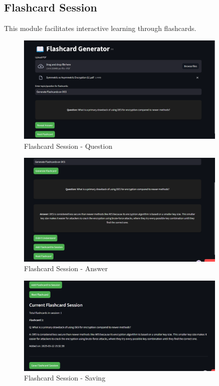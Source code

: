 \documentclass{report}
\begin{document}
\subsection{Flashcard Session}
This module facilitates interactive learning through flashcards.
\begin{figure}[H]
\centering
\includegraphics[width=0.9\textwidth]{flashcard-question.png}
\caption{Flashcard Session - Question}
\end{figure}
\begin{figure}[H]
\centering
\includegraphics[width=0.9\textwidth]{flashcard-answer.png}
\caption{Flashcard Session - Answer}
\end{figure}
\begin{figure}[H]
\centering
\includegraphics[width=0.9\textwidth]{saving-flashcard.png}
\caption{Flashcard Session - Saving}
\end{figure}
\end{document}
